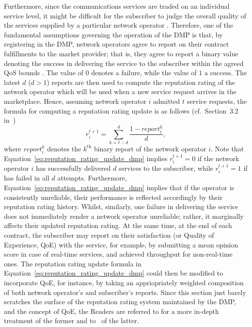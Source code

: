 Furthermore, since the communications services are traded on an individual service level, it might be difficult for the subscriber to judge the overall quality of the services supplied by a particular network operator \cite{DMIrvine02}. Therefore, one of the fundamental assumptions governing the operation of the DMP is that, by registering in the DMP, network operators agree to report on their contract fulfillments to the market provider; that is, they agree to report a binary value denoting the success in delivering the service to the subscriber within the agreed QoS bounds \cite{DMLeBodic00}. The value of $0$ denotes a failure, while the value of $1$ a success. The latest $d$ ($d>1$) reports are then used to compute the reputation rating of the network operator which will be used when a new service request arrives in the marketplace. Hence, assuming network operator $i$ admitted $t$ service requests, the formula for computing a reputation rating update is as follows (cf.~Section~3.2 in~\cite{DMLeBodic00})
\begin{equation}
    \label{eq:reputation_rating_update_dmp}
    r_i^{t+1} = \sum_{k = t-d}^d \frac{1 - report_i^k}{d},
\end{equation}
where $report_i^k$ denotes the $k^{\text{th}}$ binary report of the network operator $i$. Note that Equation~\eqref{eq:reputation_rating_update_dmp} implies $r_i^{t+1} = 0$ if the network operator $i$ has successfully delivered $d$ services to the subscriber, while $r_i^{t+1} = 1$ if has failed in all $d$ attempts. Furthermore, Equation~\eqref{eq:reputation_rating_update_dmp} implies that if the operator is consistently unreliable, their performance is reflected accordingly by their reputation rating history. Whilst, similarly, one failure in delivering the service does not immediately render a network operator unreliable; rather, it marginally affects their updated reputation rating. At the same time, at the end of each contract, the subscriber may report on their satisfaction (or Quality of Experience, QoE) with the service, for example, by submitting a mean opinion score in case of real-time services, and achieved throughput for non-real-time ones. The reputation rating update formula in Equation~\eqref{eq:reputation_rating_update_dmp} could then be modified to incorporate QoE, for instance, by taking an appriopriately weighted composition of both network operator's and subscriber's reports. Since this section just barely scratches the surface of the reputation rating system maintained by the DMP, and the concept of QoE, the Readers are referred to \cite{DMLeBodic00,DMIrvine01,DMIrvine02,LeBodicThesis,DMMathur02,DMMcDiarmid06} for a more in-depth treatment of the former and to~\cite{Kilkki2008, BrooksHestnes2010, Fiedler2010, Shaikh2010} of the latter.

